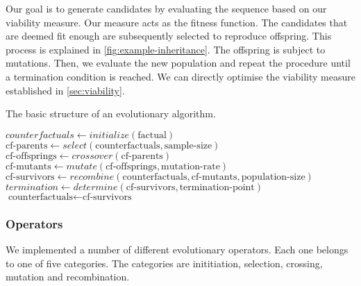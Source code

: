 \documentclass[./../../paper.tex]{subfiles}
\begin{document}
Our goal is to generate candidates by evaluating the sequence based on our viability measure. Our measure acts as the fitness function. The candidates that are deemed fit enough are subsequently selected to reproduce offspring. This process is explained in \autoref{fig:example-inheritance}. The offspring is subject to mutations. Then, we evaluate the new population and repeat the procedure until a termination condition is reached. We can directly optimise the viability measure established in \autoref{sec:viability}.

\newcommand{\cf}{\text{counterfactuals}}
\newcommand{\cfp}{\text{cf-parents}}
\newcommand{\cfo}{\text{cf-offsprings}}
\newcommand{\cfm}{\text{cf-mutants}}
\newcommand{\cfs}{\text{cf-survivors}}


\begin{algorithm}[htb!]
    \caption{The basic structure of an evolutionary algorithm.}
    \begin{algorithmic}

        \State $counterfactuals \gets initialize(\text{factual})$
        \State $\cfp \gets select(\cf, \text{sample-size})$
        \State $\cfo \gets crossover(\cfp) $
        \State $\cfm \gets mutate(\cfo, \text{mutation-rate})$
        \State $\cfs \gets recombine(\cf, \cfm, \text{population-size})$
        \State $termination \gets determine(\cfs, \text{termination-point})$
        \State $\cf \gets \cfs$
        \EndWhile
    \end{algorithmic}
    \label{alg:my-evolutionary}
\end{algorithm}

\subsubsection{Operators}
We implemented a number of different evolutionary operators. Each one belongs to one of five categories. The categories are inititiation, selection, crossing, mutation and recombination.
\end{document}
